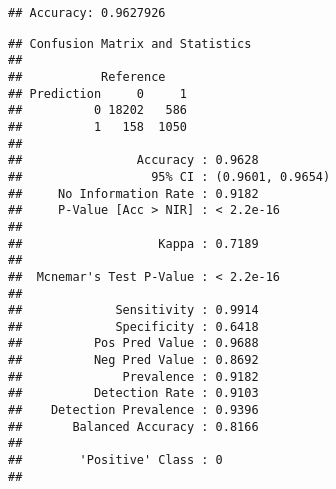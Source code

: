 \documentclass[
]{article}
\newenvironment{Shaded}{\begin{snugshade}}{\end{snugshade}}
\newcommand{\CommentTok}[1]{\textcolor[rgb]{0.56,0.35,0.01}{\textit{#1}}}
\newcommand{\FunctionTok}[1]{\textcolor[rgb]{0.13,0.29,0.53}{\textbf{#1}}}
\newcommand{\NormalTok}[1]{#1}
\newcommand{\SpecialCharTok}[1]{\textcolor[rgb]{0.81,0.36,0.00}{\textbf{#1}}}
\begin{document}
\begin{verbatim}
## Accuracy: 0.9627926
\end{verbatim}

\begin{Shaded}
\end{Shaded}

\begin{verbatim}
## Confusion Matrix and Statistics
## 
##           Reference
## Prediction     0     1
##          0 18202   586
##          1   158  1050
##                                           
##                Accuracy : 0.9628          
##                  95% CI : (0.9601, 0.9654)
##     No Information Rate : 0.9182          
##     P-Value [Acc > NIR] : < 2.2e-16       
##                                           
##                   Kappa : 0.7189          
##                                           
##  Mcnemar's Test P-Value : < 2.2e-16       
##                                           
##             Sensitivity : 0.9914          
##             Specificity : 0.6418          
##          Pos Pred Value : 0.9688          
##          Neg Pred Value : 0.8692          
##              Prevalence : 0.9182          
##          Detection Rate : 0.9103          
##    Detection Prevalence : 0.9396          
##       Balanced Accuracy : 0.8166          
##                                           
##        'Positive' Class : 0               
## 
\end{verbatim}
\end{document}
